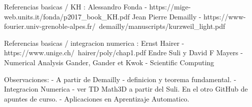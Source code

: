 Referencias basicas / KH :
Alessandro Fonda - https://mige-web.units.it/fonda/p2017_book_KH.pdf
Jean Pierre Demailly - https://www-fourier.univ-grenoble-alpes.fr/~demailly/manuscripts/kurzweil_light.pdf

Referencias basicas / integracion numerica :
Ernst Hairer - https://www.unige.ch/~hairer/poly/chap1.pdf
Endre Suli y David F Mayers - Numerical Analysis
Gander, Gander et Kwok - Scientific Computing

Observaciones:
- A partir de Demailly - definicion y teorema fundamental.
- Integracion Numerica - ver TD Math3D a partir del Suli. En el otro GitHub de apuntes de curso.
- Aplicaciones en Aprentizaje Automatico. 
